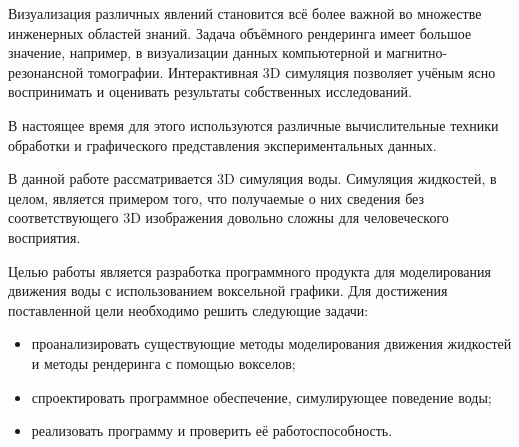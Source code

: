\Introduction

Визуализация различных явлений становится всё более важной во множестве инженерных
областей знаний.
Задача объёмного рендеринга имеет большое значение, например, в визуализации данных
компьютерной и магнитно-резонансной томографии\cite{book:ash}.
Интерактивная 3D симуляция позволяет учёным ясно воспринимать и
оценивать результаты собственных исследований.

В настоящее время для этого используются различные вычислительные техники обработки
 и графического представления экспериментальных данных\cite{book:physical}.

В данной работе рассматривается 3D симуляция воды. Симуляция жидкостей, в целом,
является примером того, что получаемые о них сведения без соответствующего 3D изображения
довольно сложны для человеческого восприятия.

Целью работы является разработка программного продукта для моделирования движения воды с использованием воксельной графики. Для достижения поставленной цели необходимо решить следующие задачи:

\begin{itemize}
\item проанализировать существующие методы моделирования движения жидкостей и методы рендеринга с помощью вокселов;
\item спроектировать программное обеспечение, симулирующее поведение воды;
\item реализовать программу и проверить её работоспособность.
\end{itemize}
